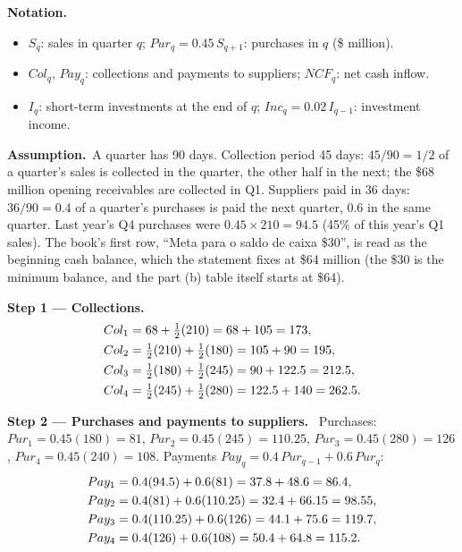 \documentclass[11pt,a4paper]{article}
\newcommand{\notation}{\par\noindent\textbf{Notation.}}
\newcommand{\step}[2]{\par\medskip\noindent\textbf{Step #1 --- #2.}~}
\newcommand{\assume}{\par\smallskip\noindent\textbf{Assumption.}~}
\newcommand{\pt}{\foreignlanguage{brazilian}}
\begin{document}
\notation
\begin{itemize}
  \item $S_q$: sales in quarter $q$; $Pur_q = 0.45\,S_{q+1}$: purchases in $q$ (\$ million).
  \item $Col_q$, $Pay_q$: collections and payments to suppliers; $NCF_q$: net cash inflow.
  \item $I_q$: short-term investments at the end of $q$; $Inc_q = 0.02\,I_{q-1}$: investment income.
\end{itemize}
\assume A quarter has 90 days. Collection period 45 days: $45/90 = 1/2$ of a quarter's sales is
collected in the quarter, the other half in the next; the \$68 million opening receivables are
collected in Q1. Suppliers paid in 36 days: $36/90 = 0.4$ of a quarter's purchases is paid the
next quarter, $0.6$ in the same quarter. Last year's Q4 purchases were $0.45 \times 210 = 94.5$
(45\% of this year's Q1 sales). The book's first row, \pt{``Meta para o saldo de caixa \$30''}, is
read as the beginning cash balance, which the statement fixes at \$64 million (the \$30 is the
minimum balance, and the part (b) table itself starts at \$64).

\step{1}{Collections}
\begin{align}
  Col_1 &= 68 + \tfrac12(210) = 68 + 105 = 173, \notag\\
  Col_2 &= \tfrac12(210) + \tfrac12(180) = 105 + 90 = 195, \notag\\
  Col_3 &= \tfrac12(180) + \tfrac12(245) = 90 + 122.5 = 212.5, \notag\\
  Col_4 &= \tfrac12(245) + \tfrac12(280) = 122.5 + 140 = 262.5. \notag
\end{align}

\step{2}{Purchases and payments to suppliers}
Purchases: $Pur_1 = 0.45(180) = 81$, $Pur_2 = 0.45(245) = 110.25$, $Pur_3 = 0.45(280) = 126$,
$Pur_4 = 0.45(240) = 108$. Payments $Pay_q = 0.4\,Pur_{q-1} + 0.6\,Pur_q$:
\begin{align}
  Pay_1 &= 0.4(94.5) + 0.6(81) = 37.8 + 48.6 = 86.4, \notag\\
  Pay_2 &= 0.4(81) + 0.6(110.25) = 32.4 + 66.15 = 98.55, \notag\\
  Pay_3 &= 0.4(110.25) + 0.6(126) = 44.1 + 75.6 = 119.7, \notag\\
  Pay_4 &= 0.4(126) + 0.6(108) = 50.4 + 64.8 = 115.2. \notag
\end{align}
\end{document}
